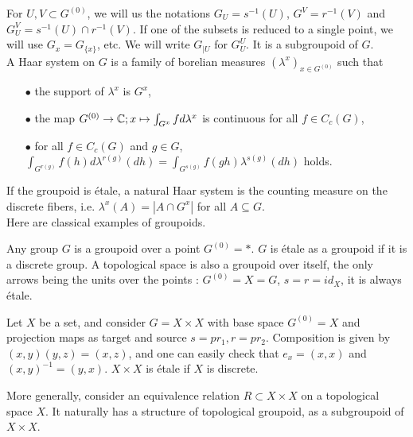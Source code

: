 For $U,V\subset G^{(0)}$, we will us the notations $G_U=s^{-1}(U)$, $G^V=r^{-1}(V)$ and $G_U^V=s^{-1}(U)\cap r^{-1}(V)$. If one of the subsets is reduced to a single point, we will use $G_x=G_{\{x\}}$, etc. We will write $G_{|U}$ for $G_U^U$. It is a subgroupoid of $G$.\\

A Haar system on $G$ is a family of borelian measures $(\lambda^x)_{x\in G^{(0)}}$ such that 
\begin{itemize}
\item[$\bullet$] the support of $\lambda^x$ is $G^x$, 
\item[$\bullet$] the map $G^{(0)} \rightarrow \mathbb C; x\mapsto \int_{G^x} f d\lambda^x$ is continuous for all $f\in C_c(G)$,
\item[$\bullet$] for all $f\in C_c(G)$ and $g\in G$, $\int_{G^{r(g)}} f(h) d\lambda^{r(g)}(dh)= \int_{G^{s(g)}} f(gh) \lambda^{s(g)}(dh)$ holds.
\end{itemize}

If the groupoid is étale, a natural Haar system is the counting measure on the discrete fibers, i.e. $\lambda^x(A) = |A\cap G^x|$ for all $A\subseteq G$.\\

Here are classical examples of groupoids.

\begin{Expl} Any group $G$ is a groupoid over a point $G^{(0)}=*$. $G$ is étale as a groupoid if it is a discrete group. A topological space is also a groupoid over itself, the only arrows being the units over the points : $G^{(0)} = X = G$, $s=r=id_X$, it is always étale.
\end{Expl}

\begin{Expl} Let $X$ be a set, and consider $G=X\times X$ with base space $G^{(0)}=X$ and projection maps as target and source $s=pr_1, r=pr_2$. Composition is given by $(x,y)(y,z)= (x,z)$, and one can easily check that $e_x=(x,x)$ and $(x,y)^{-1} = (y,x)$. $X\times X$ is étale if $X$ is discrete.
\end{Expl}

\begin{Expl} More generally, consider an equivalence relation $R \subset X\times X$ on a topological space $X$. It naturally has a structure of topological groupoid, as a subgroupoid of $X\times X$. 
\end{Expl}

